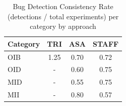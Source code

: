 \begin{table}[ht]
\centering
\renewcommand{\arraystretch}{1.1}
\begin{tabular}{|l||c|c|c|}
\hline
{\sc Category} & {\sc TRI} & {\sc ASA} & {\sc STAFF} \\
\hline\hline
OIB & 1.25 & 0.70 & 0.72 \\
OID & - & 0.60 & 0.75 \\
MID & - & 0.55 & 0.75 \\
MII & - & 0.80 & 0.57 \\
\hline
\end{tabular}
\caption{Bug Detection Consistency Rate (detections / total experiments) per category by approach}
\label{tab:detection_consistency}
\end{table}
